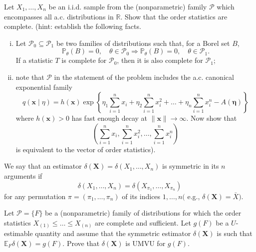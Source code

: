 \begin{ex}
    Let \(X_{1}, \ldots, X_{n}\) be an i.i.d. sample from the (nonparametric) family \(\mathcal{P}\) which encompasses all a.c. distributions in \(\mathbb{R}\). Show that the order statistics are complete. (hint: establish the following facts. 
    \begin{enumerate}[(i)]
        \item Let \(\mathcal{P}_{0} \subseteq \mathcal{P}_{1}\) be two families of distributions such that, for a Borel set \(B\),
        \[
        \mathbb{P}_{\theta}(B)=0, \quad \theta \in \mathcal{P}_{0} \Rightarrow \mathbb{P}_{\theta}(B)=0, \quad \theta \in \mathcal{P}_{1} .
        \]
        If a statistic \(T\) is complete for \(\mathcal{P}_{0}\), then it is also complete for \(\mathcal{P}_{1}\); 
        \item note that \(\mathcal{P}\) in the statement of the problem includes the a.c. canonical exponential family
        \[
        q(\mathbf{x} \mid \eta)=h(\mathbf{x}) \exp \left\{\eta_{1} \sum_{i=1}^{n} x_{i}+\eta_{2} \sum_{i=1}^{n} x_{i}^{2}+\ldots+\eta_{n} \sum_{i=1}^{n} x_{i}^{n}-A(\boldsymbol{\eta})\right\}
        \]
        where \(h(\mathbf{x})>0\) has fast enough decay at \(\|\mathbf{x}\| \rightarrow \infty\). Now show that
        \[
        \left(\sum_{i=1}^{n} x_{i}, \sum_{i=1}^{n} x_{i}^{2}, \ldots, \sum_{i=1}^{n} x_{i}^{n}\right)
        \]
        is equivalent to the vector of order statistics). 
    \end{enumerate}
\end{ex}


\begin{ex}
    We say that an estimator \(\delta(\mathbf{X})=\delta\left(X_{1}, \ldots, X_{n}\right)\) is symmetric in its \(n\) arguments if
    \[
    \delta\left(X_{1}, \ldots, X_{n}\right)=\delta\left(X_{\pi_{1}}, \ldots, X_{\pi_{n}}\right)
    \]
    for any permutation \(\pi=\left(\pi_{1}, \ldots, \pi_{n}\right)\) of its indices \(1, \ldots, n(\) e.g., \(\delta(\mathbf{X})=\bar{X})\). 

    Let \(\mathcal{P}=\{F\}\) be a (nonparametric) family of distributions for which the order statistics \(X_{(1)} \leq \ldots \leq X_{(n)}\) are complete and sufficient. Let \(g(F)\) be a \(U\)-estimable quantity and assume that the symmetric estimator \(\delta(\mathbf{X})\) is such that \(\mathbb{E}_{F} \delta(\mathbf{X})=g(F)\). Prove that \(\delta(\mathbf{X})\) is UMVU for \(g(F)\). 
\end{ex}


